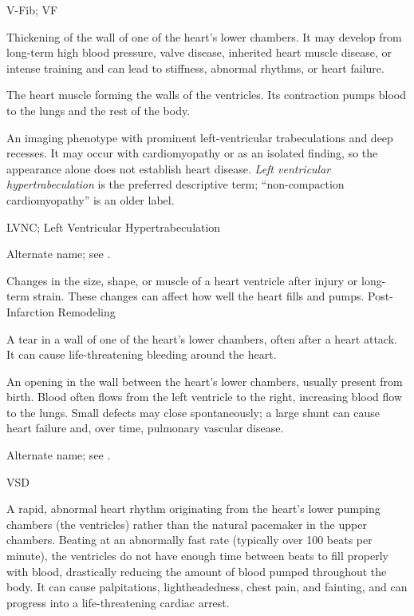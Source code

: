 \synonyms
V-Fib; VF

 Thickening of the wall of one of the heart’s lower chambers. It may develop from long-term high blood pressure, valve disease, inherited heart muscle disease, or intense training and can lead to stiffness, abnormal rhythms, or heart failure.

 The heart muscle forming the walls of the ventricles. Its contraction pumps blood to the lungs and the rest of the body.

 An imaging phenotype with prominent left-ventricular trabeculations and deep recesses. It may occur with cardiomyopathy or as an isolated finding, so the appearance alone does not establish heart disease. \textit{Left ventricular hypertrabeculation} is the preferred descriptive term; ``non-compaction cardiomyopathy'' is an older label.

\synonyms
LVNC; Left Ventricular Hypertrabeculation

 Alternate name; see .

 Changes in the size, shape, or muscle of a heart ventricle after injury or long-term strain. These changes can affect how well the heart fills and pumps.
\synonyms
Post-Infarction Remodeling

 A tear in a wall of one of the heart’s lower chambers, often after a heart attack. It can cause life-threatening bleeding around the heart.

 An opening in the wall between the heart’s lower
chambers, usually present from birth. Blood often flows from the left ventricle to the right,
increasing blood flow to the lungs. Small defects may close spontaneously; a large shunt can
cause heart failure and, over time, pulmonary vascular disease.

 Alternate name; see
  .

\synonyms
VSD

 A rapid, abnormal heart rhythm originating from the heart's lower pumping chambers (the ventricles) rather than the natural pacemaker in the upper chambers. Beating at an abnormally fast rate (typically over 100 beats per minute), the ventricles do not have enough time between beats to fill properly with blood, drastically reducing the amount of blood pumped throughout the body. It can cause palpitations, lightheadedness, chest pain, and fainting, and can progress into a life-threatening cardiac arrest.

